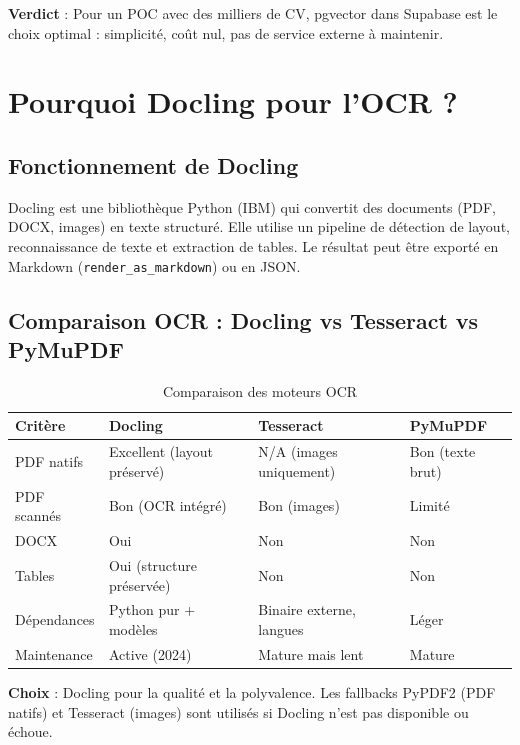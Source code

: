 \documentclass[11pt,a4paper]{report}
\begin{document}
\textbf{Verdict} : Pour un POC avec des milliers de CV, pgvector dans Supabase est le choix optimal : simplicité, coût nul, pas de service externe à maintenir.

\section{Pourquoi Docling pour l'OCR ?}

\subsection{Fonctionnement de Docling}

Docling est une bibliothèque Python (IBM) qui convertit des documents (PDF, DOCX, images) en texte structuré. Elle utilise un pipeline de détection de layout, reconnaissance de texte et extraction de tables. Le résultat peut être exporté en Markdown (\texttt{render\_as\_markdown}) ou en JSON.

\subsection{Comparaison OCR : Docling vs Tesseract vs PyMuPDF}

\begin{table}[H]
  \centering
  \caption{Comparaison des moteurs OCR}
  \small
  \begin{tabular}{@{}lp{2.2cm}p{2.2cm}p{2.2cm}@{}}
    \toprule
    \textbf{Critère} & \textbf{Docling} & \textbf{Tesseract} & \textbf{PyMuPDF} \\
    \midrule
    PDF natifs & Excellent (layout préservé) & N/A (images uniquement) & Bon (texte brut) \\
    PDF scannés & Bon (OCR intégré) & Bon (images) & Limité \\
    DOCX & Oui & Non & Non \\
    Tables & Oui (structure préservée) & Non & Non \\
    Dépendances & Python pur + modèles & Binaire externe, langues & Léger \\
    Maintenance & Active (2024) & Mature mais lent & Mature \\
    \bottomrule
  \end{tabular}
\end{table}

\textbf{Choix} : Docling pour la qualité et la polyvalence. Les fallbacks PyPDF2 (PDF natifs) et Tesseract (images) sont utilisés si Docling n'est pas disponible ou échoue.
\end{document}
